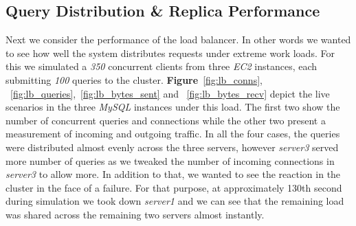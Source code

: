 \documentclass[12pt]{article}
\begin{document}
\subsection{Query Distribution \& Replica Performance} Next we
consider the performance of the load balancer. In other words we wanted to see
how well the system distributes requests under extreme work loads. For this we
simulated a \emph{350} concurrent clients from three \emph{EC2} instances, each
submitting \emph{100} queries to the cluster. \textbf{Figure}~\ref{fig:lb_conns}, ~\ref{fig:lb_queries},~\ref{fig:lb_bytes_sent} and
~\ref{fig:lb_bytes_recv} depict the live scenarios in the three \emph{MySQL}
instances under this load. The first two show the number of concurrent queries
and connections while the other two present a measurement of incoming and
outgoing traffic. In all the four cases, the queries were distributed almost
evenly across the three servers, however \emph{server3} served more number of queries
as we tweaked the number of incoming connections in \emph{server3} to allow more. In
addition to that, we wanted to see the reaction in the cluster in the face of a
failure. For that purpose, at approximately 130th second during simulation we
took down \emph{server1} and we can see that the remaining load was shared across the
remaining two servers almost instantly.  
\end{document}
